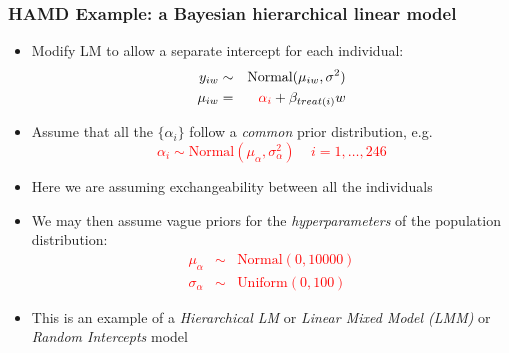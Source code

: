 \documentclass{beamer}
\begin{document}
\begin{frame}
    \frametitle{HAMD Example: a Bayesian hierarchical linear model}
    \begin{itemize}
    \item Modify LM to allow a separate intercept for each individual:
    \small
    \begin{eqnarray*}
        y_{iw} & \sim & \mbox{Normal}(\mu_{iw},\sigma^2) \\
        \mu_{iw}  & = & \textcolor{red}{\alpha_i}+\beta_{treat(i)}w
    \end{eqnarray*}
    \normalsize
    \item Assume that all the $\{\alpha_i\}$ follow a \textit{common} prior distribution, e.g.
    \small \textcolor{red}{$$\alpha_i \sim \mbox{Normal}(\mu_{\alpha}, \sigma^2_{\alpha}) \;\;\;\; i=1,\ldots,246$$} \normalsize\vspace{-5mm}
    \item[] Here we are assuming exchangeability between all the individuals\vspace{1mm}
    \item We may then assume vague priors for the \textit{hyperparameters} of the population distribution:
    \textcolor{red}{\small
    \begin{eqnarray*}
        \mu_{\alpha} & \sim & \mbox{Normal}(0,10000) \\
        \sigma_{\alpha} & \sim & \mbox{Uniform}(0,100)
    \end{eqnarray*}}
    \normalsize
    \vspace{-12pt}
    \item This is an example of a \textit{Hierarchical LM} or \textit{Linear Mixed Model (LMM)} or \textit{Random Intercepts} model
    \end{itemize}
\end{frame}
\end{document}

